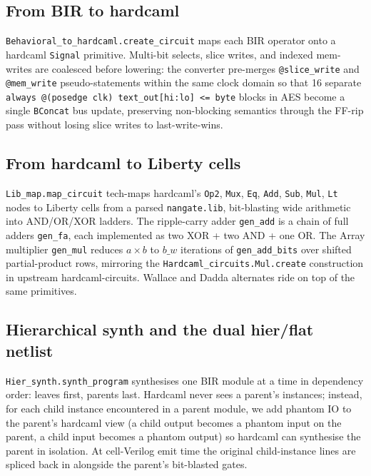\documentclass[11pt,a4paper]{article}
\begin{document}
\subsection{From BIR to hardcaml}

\texttt{Behavioral\_to\_hardcaml.create\_circuit} maps each BIR
operator onto a hardcaml \texttt{Signal} primitive.  Multi-bit
selects, slice writes, and indexed mem-writes are coalesced before
lowering: the converter pre-merges \texttt{@slice\_write} and
\texttt{@mem\_write} pseudo-statements within the same clock
domain so that 16 separate
\texttt{always @(posedge clk) text\_out[hi:lo] <= byte} blocks in
AES become a single \texttt{BConcat} bus update, preserving
non-blocking semantics through the FF-rip pass without losing
slice writes to last-write-wins.

\subsection{From hardcaml to Liberty cells}

\texttt{Lib\_map.map\_circuit} tech-maps hardcaml's \texttt{Op2},
\texttt{Mux}, \texttt{Eq}, \texttt{Add}, \texttt{Sub},
\texttt{Mul}, \texttt{Lt} nodes to Liberty cells from a parsed
\texttt{nangate.lib}, bit-blasting wide arithmetic into AND/OR/XOR
ladders.  The ripple-carry adder \texttt{gen\_add} is a chain of
full adders \texttt{gen\_fa}, each implemented as two XOR + two
AND + one OR.  The Array multiplier \texttt{gen\_mul} reduces
$a\!\times\!b$ to $b\_w$ iterations of \texttt{gen\_add\_bits} over
shifted partial-product rows, mirroring the
\texttt{Hardcaml\_circuits.Mul.create} construction in upstream
hardcaml-circuits.  Wallace and Dadda alternates ride on top of
the same primitives.

\subsection{Hierarchical synth and the dual hier/flat netlist}

\texttt{Hier\_synth.synth\_program} synthesises one BIR module at
a time in dependency order: leaves first, parents last.  Hardcaml
never sees a parent's instances; instead, for each child instance
encountered in a parent module, we add phantom IO to the parent's
hardcaml view (a child output becomes a phantom input on the
parent, a child input becomes a phantom output) so hardcaml can
synthesise the parent in isolation.  At cell-Verilog emit time
the original child-instance lines are spliced back in alongside
the parent's bit-blasted gates.
\end{document}
